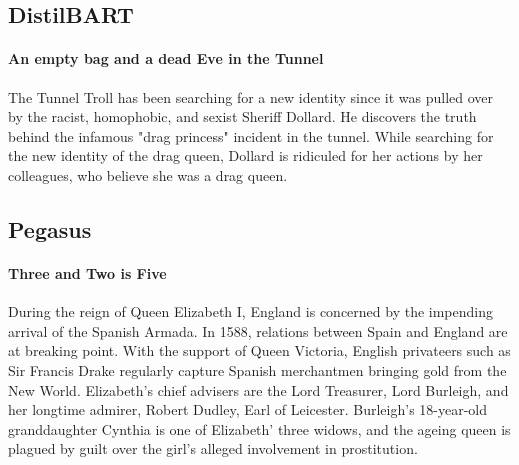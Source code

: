\documentclass[11pt,a4paper]{article}
\begin{document}
\subsection{DistilBART}
\paragraph{An empty bag and a dead Eve in the Tunnel}
The Tunnel Troll has been searching for a new identity since it was pulled over by the racist, homophobic, and sexist Sheriff Dollard. He discovers the truth behind the infamous "drag princess" incident in the tunnel.
While searching for the new identity of the drag queen, Dollard is ridiculed for her actions by her colleagues, who believe she was a drag queen.

\subsection{Pegasus}
\paragraph{Three and Two is Five}
During the reign of Queen Elizabeth I, England is concerned by the impending arrival of the Spanish Armada. In 1588, relations between Spain and England are at breaking point. With the support of Queen Victoria, English privateers such as Sir Francis Drake regularly capture Spanish merchantmen bringing gold from the New World. Elizabeth's chief advisers are the Lord Treasurer, Lord Burleigh, and her longtime admirer, Robert Dudley, Earl of Leicester. Burleigh's 18-year-old granddaughter Cynthia is one of Elizabeth' three widows, and the ageing queen is plagued by guilt over the girl's alleged involvement in prostitution.
\end{document}
